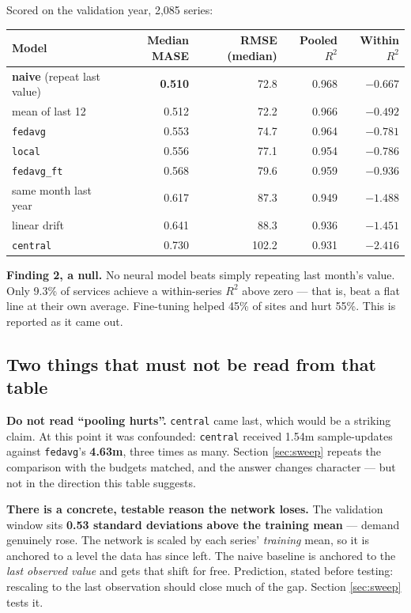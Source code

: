 \documentclass[11pt,a4paper]{article}
\newcommand{\keypoint}[1]{%
  \par\vspace{0.4em}%
  \noindent\colorbox{fed!8}{\parbox{0.98\textwidth}{\vspace{0.2em}#1\vspace{0.2em}}}%
  \par\vspace{0.4em}}
\begin{document}
Scored on the validation year, 2{,}085 series:

\begin{center}
\begin{tabular}{@{}lrrrr@{}}
\toprule
\textbf{Model} & \textbf{Median MASE} & \textbf{RMSE (median)} & \textbf{Pooled $R^2$} & \textbf{Within $R^2$} \\
\midrule
\textbf{naive} (repeat last value) & \textbf{0.510} & 72.8 & 0.968 & $-0.667$ \\
mean of last 12 & 0.512 & 72.2 & 0.966 & $-0.492$ \\
\texttt{fedavg} & 0.553 & 74.7 & 0.964 & $-0.781$ \\
\texttt{local} & 0.556 & 77.1 & 0.954 & $-0.786$ \\
\texttt{fedavg\_ft} & 0.568 & 79.6 & 0.959 & $-0.936$ \\
same month last year & 0.617 & 87.3 & 0.949 & $-1.488$ \\
linear drift & 0.641 & 88.3 & 0.936 & $-1.451$ \\
\texttt{central} & 0.730 & 102.2 & 0.931 & $-2.416$ \\
\bottomrule
\end{tabular}
\end{center}

\keypoint{\textbf{Finding 2, a null.} No neural model beats simply repeating last month's value. Only
9.3\% of services achieve a within-series $R^2$ above zero --- that is, beat a flat line at their own
average. Fine-tuning helped 45\% of sites and hurt 55\%. This is reported as it came out.}

\subsection{Two things that must not be read from that table}

\textbf{Do not read ``pooling hurts''.} \texttt{central} came last, which would be a striking claim.
At this point it was confounded: \texttt{central} received 1.54m sample-updates against
\texttt{fedavg}'s \textbf{4.63m}, three times as many. Section \ref{sec:sweep} repeats the comparison with the
budgets matched, and the answer changes character --- but not in the direction this table suggests.

\textbf{There is a concrete, testable reason the network loses.} The validation window sits
\textbf{0.53 standard deviations above the training mean} --- demand genuinely rose. The network is
scaled by each series' \emph{training} mean, so it is anchored to a level the data has since left.
The naive baseline is anchored to the \emph{last observed value} and gets that shift for free.
Prediction, stated before testing: rescaling to the last observation should close much of the gap.
Section \ref{sec:sweep} tests it.
\end{document}
